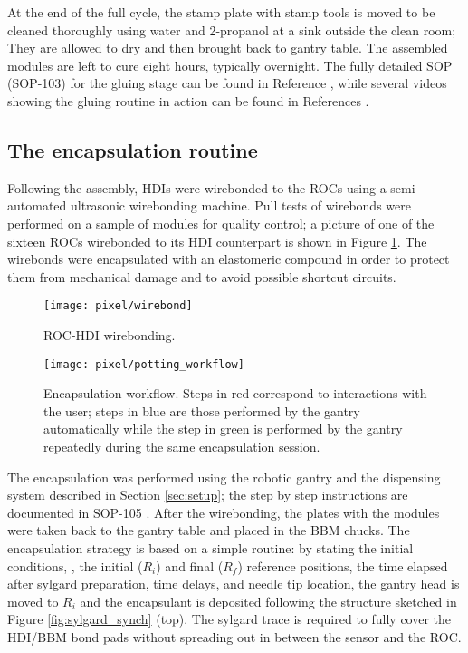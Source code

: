 At the end of the full cycle, the stamp plate with stamp tools is moved to be cleaned thoroughly using water and 2-propanol at a sink outside the clean room; They are allowed to dry and then brought back to gantry table. The assembled modules are left to cure eight hours, typically overnight. The fully detailed SOP (SOP-103) for the gluing stage can be found in Reference \cite{sop_103}, while several videos showing the gluing routine in action can be found in References \cite{gluing_frank, jmonroy_channel}. 

\subsection{The encapsulation routine}

Following the assembly, HDIs were wirebonded to the ROCs using a semi-automated ultrasonic wirebonding machine. Pull tests of wirebonds were performed on a sample of modules for quality control; a picture of one of the sixteen ROCs wirebonded to its HDI counterpart is shown in Figure \ref{fig:wirebonds}. The wirebonds were encapsulated with an elastomeric compound in order to protect them from mechanical damage and to avoid possible shortcut circuits.

\begin{figure}[h]
\begin{center}
  \texttt{[image: pixel/wirebond]}
 \caption[ROC-HDI wirebonding.]{ROC-HDI wirebonding.}\label{fig:wirebonds}
\end{center}
\end{figure}

\begin{figure}[h]
\begin{center}
  \texttt{[image: pixel/potting\_workflow]}
  \caption[Encapsulation workflow.]{Encapsulation workflow. Steps in red correspond to interactions with the user; steps in blue are those performed by the gantry automatically while the step in green is performed by the gantry repeatedly during the same encapsulation session.}\label{fig:potting_workflow}
\end{center}
\end{figure}

The encapsulation was performed using the robotic gantry and the dispensing system described in Section \ref{sec:setup}; the step by step instructions are documented in SOP-105 \cite{sop_105}. After the wirebonding, the plates with the modules were taken back to the gantry table and placed in the BBM chucks. The encapsulation strategy is based on a simple routine: by stating the initial conditions, \ie, the initial ($R_i$) and final ($R_f$) reference positions, the time elapsed after sylgard preparation, time delays, and needle tip location, the gantry head is moved to $R_i$ and the encapsulant is deposited following the structure sketched in Figure \ref{fig:sylgard_synch} (top). The sylgard trace is required to fully cover the HDI/BBM bond pads without spreading out in between the sensor and the ROC.

